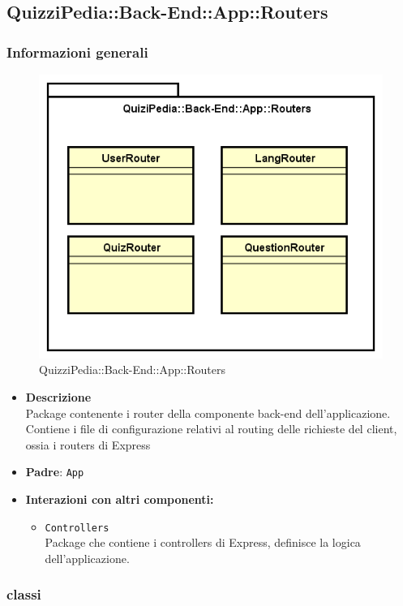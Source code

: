 \subsection{QuizziPedia::Back-End::App::Routers}
\subsubsection{Informazioni generali}
\label{QuizziPedia::Back-End::App::Routers}
\begin{figure}
	\centering
	\includegraphics[scale=0.45]{UML/Package/QuizziPedia_Back-End_App_Routers.png}
	\caption{QuizziPedia::Back-End::App::Routers}
\end{figure}
\FloatBarrier
	\begin{itemize}
		\item \textbf{Descrizione} \\
		Package contenente i router della componente back-end dell'applicazione. Contiene i file di configurazione relativi al routing delle richieste del client, ossia i routers di Express
		\item \textbf{Padre}: \texttt{App}
		\item \textbf{Interazioni con altri componenti:}
			\begin{itemize}
				\item \texttt{Controllers} \\
				Package che contiene i controllers di Express, definisce la logica dell'applicazione.
			\end{itemize}
	\end{itemize}
\subsubsection{classi}





